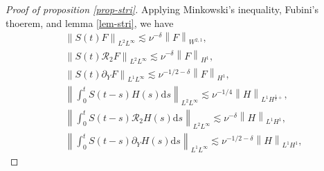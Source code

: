 \documentclass[12pt]{article}
\def\e{\mathrm{e}}
\def\d{\mathrm{d}}
\numberwithin{equation}{section}
\begin{document}
	\begin{proof}[Proof of proposition \ref{prop-stri}]
	Applying Minkowski's inequality, Fubini's thoerem, and lemma \ref{lem-stri}, we have
    \begin{align*}
        &\left\| S(t) F\right \| _{L^2L^{\infty}} \lesssim \nu^{-\delta} \left \| F\right \| _{W^{2,1}},\\
		&\left\| S(t) \mathcal{R}_2 F \right \| _{L^2L^{\infty}} \lesssim \nu^{-\delta } \left \| F\right \| _{H^1},\\
		&\left\| S(t) \partial_Y F \right \| _{L^1 L^{\infty}} \lesssim \nu^{-1/2-\delta } \left \| F\right \| _{H^1},\\
		&\left\| \int_0^t S(t-s) H(s) \d s \right \| _{L^2L^{\infty}} \lesssim \nu^{-1/4} \left \| H\right \| _{L^1H^{\frac{1}{2}+}},\\
		&\left\| \int_0^t S(t-s) \mathcal{R}_2 H(s) \d s \right \| _{L^2L^{\infty}} \lesssim \nu^{-\delta} \left \| H\right \| _{L^1 H^1},\\
		&\left\| \int_0^t S(t-s) \partial_Y H(s) \d s \right \| _{L^1 L^{\infty}} \lesssim \nu^{-1/2-\delta} \left \| H\right \| _{L^1 H^1},
	\end{align*}

\end{proof}
\end{document}
